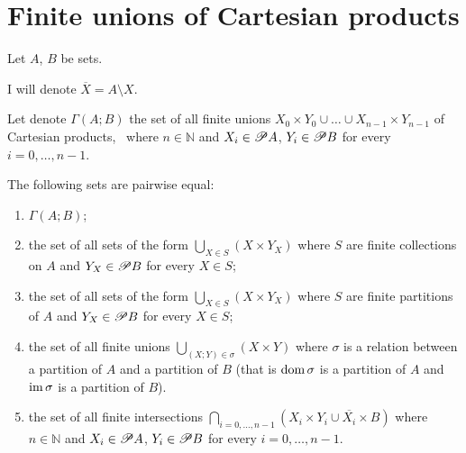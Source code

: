 \section{Finite unions of Cartesian products}

Let $A$, $B$ be sets.

I will denote $\overline{X}=A\setminus X$.

Let denote $\Gamma(A;B)$ the set of all finite unions $X_{0}\times Y_{0}\cup\ldots\cup X_{n-1}\times Y_{n-1}$
of Cartesian products, \ where $n\in\mathbb{N}$ and $X_{i}\in\mathscr{P} A$,
$Y_{i}\in\mathscr{P} B$ for every $i=0,\ldots,n-1$.
\begin{prop}
The following sets are pairwise equal:
\begin{enumerate}
\item \label{gamma-gamma}$\Gamma(A;B)$;
\item \label{gamma-YX}the set of all sets of the form $\bigcup_{X\in S}(X\times Y_{X})$
where $S$ are finite collections on $A$ and $Y_{X}\in\mathscr{P} B$
for every $X\in S$;
\item \label{gamma-YXpart}the set of all sets of the form $\bigcup_{X\in S}(X\times Y_{X})$
where $S$ are finite partitions of $A$ and $Y_{X}\in\mathscr{P} B$
for every $X\in S$;
\item \label{gamma-sigma}the set of all finite unions $\bigcup_{(X;Y)\in\sigma}(X\times Y)$
where $\sigma$ is a relation between a partition of $A$ and a partition
of $B$ (that is $\operatorname{dom}\sigma$ is a partition of $A$ and $\operatorname{im}\sigma$
is a partition of $B$).
\item \label{gamma-lineX}the set of all finite intersections $\bigcap_{i=0,\ldots,n-1}\left(X_{i}\times Y_{i}\cup\overline{X_{i}}\times B\right)$
where $n\in\mathbb{N}$ and $X_{i}\in\mathscr{P} A$, $Y_{i}\in\mathscr{P} B$
for every $i=0,\ldots,n-1$.
\end{enumerate}
\end{prop}
